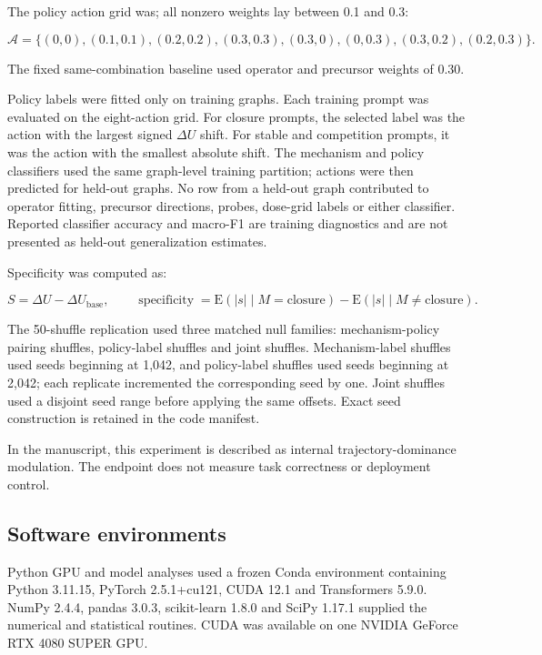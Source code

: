 \documentclass[11pt]{article}
\begin{document}
The policy action grid was; all nonzero weights lay between 0.1 and 0.3:

\begin{equation*}
\mathcal{A}=\{(0,0),(0.1,0.1),(0.2,0.2),(0.3,0.3),
(0.3,0),(0,0.3),(0.3,0.2),(0.2,0.3)\}.
\end{equation*}

The fixed same-combination baseline used operator and precursor weights of 0.30.

Policy labels were fitted only on training graphs. Each training prompt was evaluated on the eight-action grid. For closure prompts, the selected label was the action with the largest signed \(\Delta U\) shift. For stable and competition prompts, it was the action with the smallest absolute shift. The mechanism and policy classifiers used the same graph-level training partition; actions were then predicted for held-out graphs. No row from a held-out graph contributed to operator fitting, precursor directions, probes, dose-grid labels or either classifier. Reported classifier accuracy and macro-F1 are training diagnostics and are not presented as held-out generalization estimates.

Specificity was computed as:

\begin{equation*}
S=\Delta U-\Delta U_{\mathrm{base}},\qquad
\operatorname{specificity}=\mathrm{E}(|s|\mid M=\mathrm{closure})
-\mathrm{E}(|s|\mid M\neq\mathrm{closure}).
\end{equation*}

The 50-shuffle replication used three matched null families: mechanism-policy pairing shuffles, policy-label shuffles and joint shuffles. Mechanism-label shuffles used seeds beginning at 1,042, and policy-label shuffles used seeds beginning at 2,042; each replicate incremented the corresponding seed by one. Joint shuffles used a disjoint seed range before applying the same offsets. Exact seed construction is retained in the code manifest.

In the manuscript, this experiment is described as internal trajectory-dominance modulation. The endpoint does not measure task correctness or deployment control.

\subsection*{Software environments}
Python GPU and model analyses used a frozen Conda environment containing Python 3.11.15, PyTorch 2.5.1+cu121, CUDA 12.1 and Transformers 5.9.0. NumPy 2.4.4, pandas 3.0.3, scikit-learn 1.8.0 and SciPy 1.17.1 supplied the numerical and statistical routines. CUDA was available on one NVIDIA GeForce RTX 4080 SUPER GPU.
\end{document}
